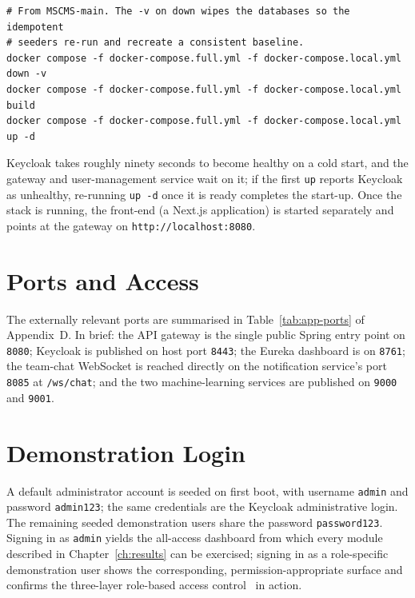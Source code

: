 \begin{lstlisting}[language=bashx,caption={Bringing the full stack up.},label={lst:composeup}]
# From MSCMS-main. The -v on down wipes the databases so the idempotent
# seeders re-run and recreate a consistent baseline.
docker compose -f docker-compose.full.yml -f docker-compose.local.yml down -v
docker compose -f docker-compose.full.yml -f docker-compose.local.yml build
docker compose -f docker-compose.full.yml -f docker-compose.local.yml up -d
\end{lstlisting}

Keycloak takes roughly ninety seconds to become healthy on a cold start, and the gateway and
user-management service wait on it; if the first \texttt{up} reports Keycloak as unhealthy,
re-running \texttt{up -d} once it is ready completes the start-up. Once the stack is running,
the front-end (a Next.js application) is started separately and points at the gateway on
\texttt{http://localhost:8080}.

\section{Ports and Access}
\label{app:deploy-ports}

The externally relevant ports are summarised in Table~\ref{tab:app-ports} of
Appendix~D. In brief: the API gateway is the single public Spring entry point on
\texttt{8080}; Keycloak is published on host port \texttt{8443}; the Eureka dashboard is on
\texttt{8761}; the team-chat WebSocket is reached directly on the notification service's port
\texttt{8085} at \texttt{/ws/chat}; and the two machine-learning services are published on
\texttt{9000} and \texttt{9001}.

\section{Demonstration Login}
\label{app:deploy-login}

A default administrator account is seeded on first boot, with username \texttt{admin} and
password \texttt{admin123}; the same credentials are the Keycloak administrative login. The
remaining seeded demonstration users share the password \texttt{password123}. Signing in as
\texttt{admin} yields the all-access dashboard from which every module described in
Chapter~\ref{ch:results} can be exercised; signing in as a role-specific demonstration user
shows the corresponding, permission-appropriate surface and confirms the three-layer
role-based access control~\cite{rbac} in action.

